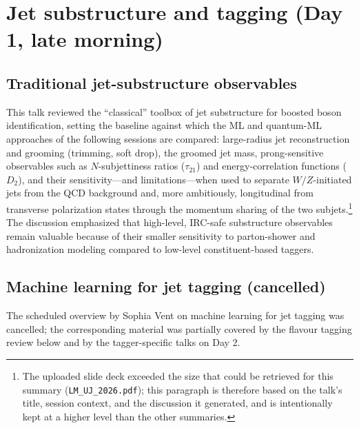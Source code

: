\section{Jet substructure and tagging (Day 1, late morning)}

\subsection{Traditional jet-substructure observables}
This talk reviewed the ``classical'' toolbox of jet substructure for boosted
boson identification, setting the baseline against which the ML and quantum-ML
approaches of the following sessions are compared: large-radius jet
reconstruction and grooming (trimming, soft drop), the groomed jet mass,
prong-sensitive observables such as $N$-subjettiness ratios ($\tau_{21}$) and
energy-correlation functions ($D_2$), and their sensitivity---and
limitations---when used to separate $W/Z$-initiated jets from the QCD
background and, more ambitiously, longitudinal from transverse polarization
states through the momentum sharing of the two subjets.\footnote{The uploaded
slide deck exceeded the size that could be retrieved for this summary
(\texttt{LM\_UJ\_2026.pdf}); this paragraph is therefore based on the talk's
title, session context, and the discussion it generated, and is intentionally
kept at a higher level than the other summaries.} The discussion emphasized
that high-level, IRC-safe substructure observables remain valuable because of
their smaller sensitivity to parton-shower and hadronization modeling compared
to low-level constituent-based taggers.

\subsection{Machine learning for jet tagging (cancelled)}
The scheduled overview by Sophia Vent on machine learning for jet tagging was
cancelled; the corresponding material was partially covered by the flavour
tagging review below and by the tagger-specific talks on Day 2.

